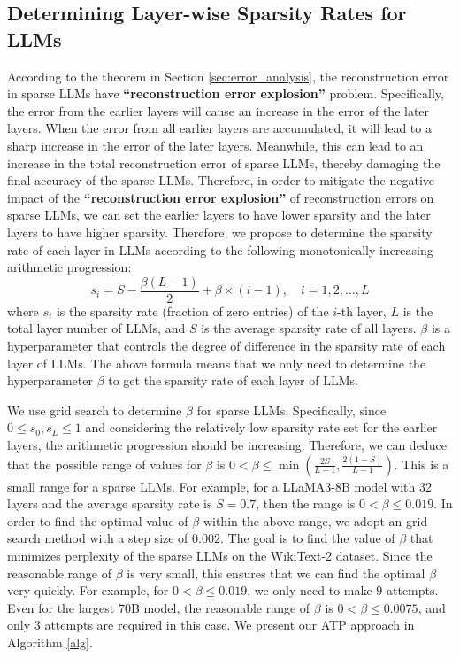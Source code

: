 \subsection{Determining Layer-wise Sparsity Rates for LLMs}\label{Layer-wiseSparsity}
According to the theorem in Section \ref{sec:error_analysis}, the reconstruction error in sparse LLMs have \textbf{``reconstruction error explosion''} problem. Specifically, the error from the earlier layers will cause an increase in the error of the later layers. When the error from all earlier layers are accumulated, it will lead to a sharp increase in the error of the later layers. Meanwhile, this can lead to an increase in the total reconstruction error of sparse LLMs, thereby damaging the final accuracy of the sparse LLMs. Therefore, in order to mitigate the negative impact of the \textbf{``reconstruction error explosion''} of reconstruction errors on sparse LLMs, we can set the earlier layers to have lower sparsity and the later layers to have higher sparsity. Therefore, we propose to determine the sparsity rate of each layer in LLMs according to the following monotonically increasing arithmetic progression:
\begin{equation}\label{eq:sparsityrates}
s_i = S-\frac{\beta(L-1)}{2}+ \beta \times (i-1),
\quad
i=1,2,\dots,L
\end{equation}
where $s_i$ is the sparsity rate (fraction of zero entries) of the $i$-th layer, $L$ is the total layer number of LLMs, and $S$ is the average sparsity rate of all layers. $\beta$ is a hyperparameter that controls the degree of difference in the sparsity rate of each layer of LLMs. The above formula means that we only need to determine the hyperparameter $\beta$ to get the sparsity rate of each layer of LLMs.

We use grid search \citep{jimenez2008finding} to determine $\beta$ for sparse LLMs. Specifically, since $0\le s_0, s_L\le 1$ and considering the relatively low sparsity rate set for the earlier layers, the arithmetic progression should be increasing. Therefore, we can deduce that the possible range of values for $\beta$ is $0 < \beta \le \min(\frac{2S}{L-1}, \frac{2(1-S)}{L-1})$. This is a small range for a sparse LLMs. For example, for a LLaMA3-8B \citep{llama3} model with 32 layers and the average sparsity rate is $S=0.7$, then the range is $0 < \beta \le 0.019$. In order to find the optimal value of $\beta$ within the above  range, we adopt an grid search method with a step size of $0.002$. The goal is to find the value of $\beta$ that minimizes perplexity of the sparse LLMs on the WikiText-2 \citep{merity2016pointer} dataset. Since the reasonable range of $\beta$ is very small, this ensures that we can find the optimal $\beta$ very quickly. For example, for $0 < \beta \leq 0.019$, we only need to make $9$ attempts. Even for the largest 70B model, the reasonable range of $\beta$ is $0 < \beta \leq 0.0075$, and only $3$ attempts are required in this case. We present our ATP approach in Algorithm \ref{alg}.


